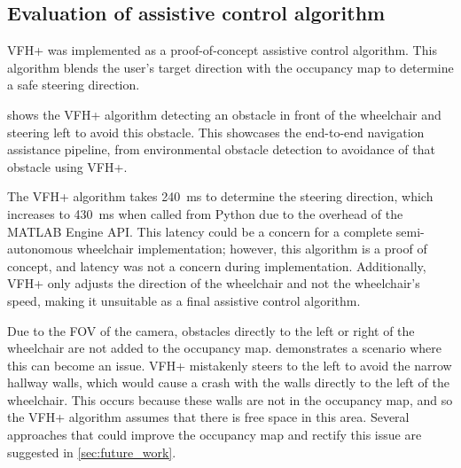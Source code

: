 
\subsection{Evaluation of assistive control algorithm}
VFH+ was implemented as a proof-of-concept assistive control algorithm.
This algorithm blends the user's target direction with the occupancy map
to determine a safe steering direction.

 shows the VFH+ algorithm detecting an obstacle in front of
the wheelchair and steering left to avoid this obstacle. This
showcases the end-to-end navigation assistance pipeline,
from environmental obstacle detection to
avoidance of that obstacle using VFH+.

The VFH+ algorithm takes
\SI{240}{\milli\second} to determine the steering direction, which increases to
\SI{430}{\milli\second} when called from Python due to the overhead of the MATLAB Engine API.
This latency could be a concern for a complete semi-autonomous wheelchair implementation;
however, this algorithm is a proof of concept, and latency was not a concern during implementation.
Additionally, VFH+ only adjusts the direction of the wheelchair and not the wheelchair's speed,
making it unsuitable as a final assistive control algorithm.

Due to the FOV of the camera, obstacles directly to the left or right of the wheelchair are not added
to the occupancy map.  demonstrates a scenario where this can
become an issue. VFH+ mistakenly steers to the left to avoid the narrow hallway walls,
which would cause a crash with the walls directly to the left of the wheelchair.
This occurs because these walls are not in the occupancy map, and so the VFH+ algorithm
assumes that there is free space in this area.
Several approaches that could improve the occupancy map and rectify this issue
are suggested in \cref{sec:future_work}.


